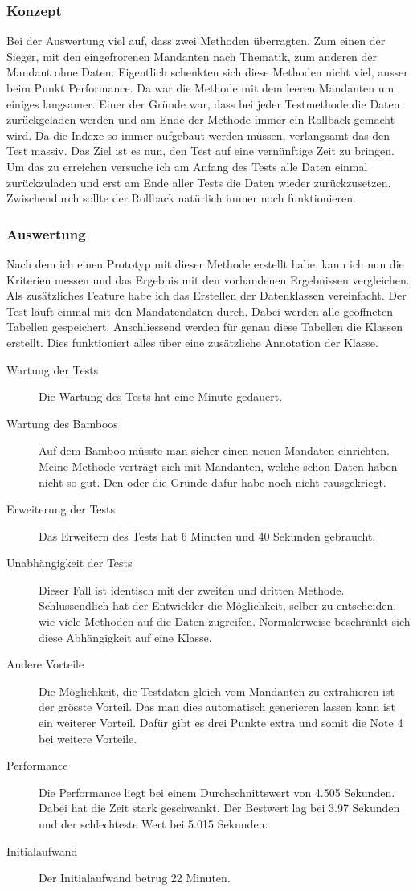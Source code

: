 \subsubsection{Konzept}
Bei der Auswertung viel auf, dass zwei Methoden überragten. Zum einen der Sieger, mit den eingefrorenen Mandanten nach Thematik, zum anderen der Mandant ohne Daten. Eigentlich schenkten sich diese Methoden nicht viel, ausser beim Punkt Performance. Da war die Methode mit dem leeren Mandanten um einiges langsamer. Einer der Gründe war, dass bei jeder Testmethode die Daten zurückgeladen werden und am Ende der Methode immer ein Rollback gemacht wird. Da die Indexe so immer aufgebaut werden müssen, verlangsamt das den Test massiv. Das Ziel ist es nun, den Test auf eine vernünftige Zeit zu bringen. Um das zu erreichen versuche ich am Anfang des Tests alle Daten einmal zurückzuladen und erst am Ende aller Tests die Daten wieder zurückzusetzen. Zwischendurch sollte der Rollback natürlich immer noch funktionieren. 
\subsubsection{Auswertung}
Nach dem ich einen Prototyp mit dieser Methode erstellt habe, kann ich nun die Kriterien messen und das Ergebnis mit den vorhandenen Ergebnissen vergleichen. Als zusätzliches Feature habe ich das Erstellen der Datenklassen vereinfacht. Der Test läuft einmal mit den Mandatendaten durch. Dabei werden alle geöffneten Tabellen gespeichert. Anschliessend werden für genau diese Tabellen die Klassen erstellt. Dies funktioniert alles über eine zusätzliche Annotation der Klasse.
\begin{description}
\item[Wartung der Tests] Die Wartung des Tests hat eine Minute gedauert.
\item[Wartung des Bamboos] Auf dem Bamboo müsste man sicher einen neuen Mandaten einrichten. Meine Methode verträgt sich mit Mandanten, welche schon Daten haben nicht so gut. Den oder die Gründe dafür habe noch nicht rausgekriegt.
\item[Erweiterung der Tests] Das Erweitern des Tests hat 6 Minuten und 40 Sekunden gebraucht.
\item[Unabhängigkeit der Tests] Dieser Fall ist identisch mit der zweiten und dritten Methode. Schlussendlich hat der Entwickler die Möglichkeit, selber zu entscheiden, wie viele Methoden auf die Daten zugreifen. Normalerweise beschränkt sich diese Abhängigkeit auf eine Klasse.
\item[Andere Vorteile] Die Möglichkeit, die Testdaten gleich vom Mandanten zu extrahieren ist der grösste Vorteil. Das man dies automatisch generieren lassen kann ist ein weiterer Vorteil. Dafür gibt es drei Punkte extra und somit die Note 4 bei weitere Vorteile.
\item[Performance] Die Performance liegt bei einem Durchschnittswert von 4.505 Sekunden. Dabei hat die Zeit stark geschwankt. Der Bestwert lag bei 3.97 Sekunden und der schlechteste Wert bei 5.015 Sekunden.
\item[Initialaufwand] Der Initialaufwand betrug 22 Minuten.
\end{description}
